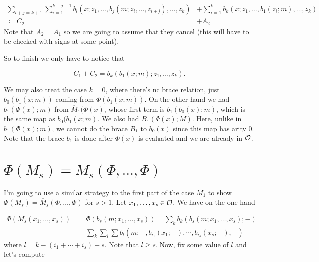 \documentclass[twoside]{article}
\begin{document}
 \begin{align*}
 \sum_{l+j=k+1}\sum_{i=1}^{k-j+1} b_l(x;z_1,\dots,b_j(m;z_{i},\dots, z_{i+j}),\dots, z_k)&+\sum_{i=1}^{k} b_k(x;z_1,\dots,b_1(z_{i};m),\dots, z_k)\\
 \coloneqq C_2&+A_2
 \end{align*}
 Note that $A_2=A_1$ so we are going to assume that they cancel (this will have to be checked with signs at some point).
 
 So to finish we only have to notice that 
 
 $$C_1+C_2=b_k(b_1(x;m);z_1,\dots, z_k).$$
 
 
 We may also treat the case $k=0$, where there's no brace relation, just $b_0(b_1(x;m))$ coming from $\Phi(b_1(x;m))$. On the other hand we had $b_1(\Phi(x);m)$ from $\overline{M}_1(\Phi(x)$, whose first term is $b_1(b_0(x);m)$, which is the same map as $b_0(b_1(x;m)$. We also had $B_1(\Phi(x);M)$. Here, unlike in $b_1(\Phi(x);m)$, we cannot do the brace $B_1$ to $b_0(x)$ since this map has arity 0. Note that the brace $b_1$ is done after $\Phi(x)$ is evaluated and we are already in ${\mathcal O}$. 



\section{$\Phi(M_s)=\overline{M}_s(\Phi,\dots,\Phi)$}


I'm going to use a similar strategy to the first part of the case $M_1$ to show $\Phi(M_s)=\overline{M}_s(\Phi,\dots,\Phi)$ for $s>1$. Let $x_1,\dots, x_s\in{\mathcal O}$. We have on the one hand

\begin{align*}
\Phi(M_s(x_1,\dots, x_s))=&\Phi(b_s(m;x_1,\dots, x_s))=\sum_k b_k(b_s(m;x_1,\dots, x_s);-)=\\
&\sum_k\sum_l\sum b_l(m; -, b_{i_1}(x_1;-),\cdots,b_{i_s}(x_s;-),-)
\end{align*}
where $l=k-(i_1+\cdots+i_s)+s$. Note that $l\geq s$. Now, fix some value of $l$ and let's compute
\end{document}
